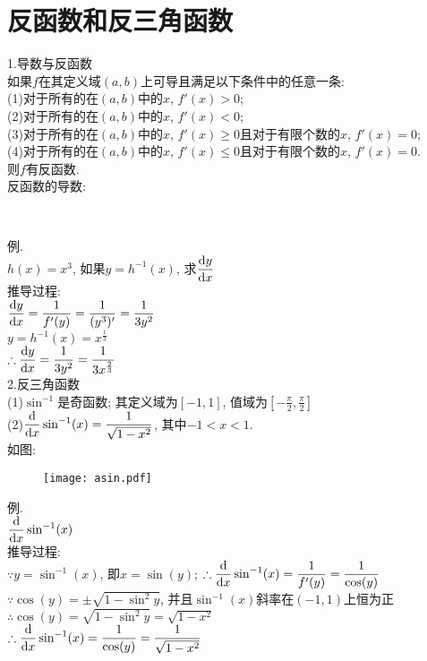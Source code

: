 \chapter{反函数和反三角函数}
1.导数与反函数\\
如果$f$在其定义域$(a,b)$上可导且满足以下条件中的任意一条:\\
(1)对于所有的在$(a,b)$中的$x$, $f'(x)>0$;\\
(2)对于所有的在$(a,b)$中的$x$, $f'(x)<0$;\\
(3)对于所有的在$(a,b)$中的$x$, $f'(x)\geqslant 0$且对于有限个数的$x$, $f'(x)=0$;\\
(4)对于所有的在$(a,b)$中的$x$, $f'(x)\leqslant 0$且对于有限个数的$x$, $f'(x)=0$.\\
则$f$有反函数.\\[2ex]

反函数的导数:
\begin{center}
\\[1ex]
\end{center}
例.\\
\phantom{例}$h(x)=x^3$, 如果$y=h^{-1}(x)$, 求$\displaystyle\frac{\mathop{}\!\mathrm{d} y}{\mathop{}\!\mathrm{d} x}$\\
推导过程:\\
$\displaystyle\frac{\mathop{}\!\mathrm{d} y}{\mathop{}\!\mathrm{d} x}=\frac{1}{f'(y)}=\frac{1}{(y^3)'}=\frac{1}{3y^2}$\\
$\displaystyle y=h^{-1}(x)=x^{\frac{1}{3}}$\\
$\displaystyle\therefore\frac{\mathop{}\!\mathrm{d} y}{\mathop{}\!\mathrm{d} x}=\frac{1}{3y^2}=\frac{1}{3x^{\frac{2}{3}}}$\\[2ex]

2.反三角函数\\
(1)$\sin^{-1}$是奇函数; 其定义域为$[-1,1]$, 值域为$\displaystyle[-\frac{\pi}{2},\frac{\pi}{2}]$\\[1ex]
(2)$\displaystyle\frac{\mathop{}\!\mathrm{d} }{\mathop{}\!\mathrm{d} x}\sin^{-1}(x)=\frac{1}{\sqrt{1-x^2}}$, 其中$-1<x<1$.\\[1ex]
如图:
\begin{figure}[H]
\centering
	\texttt{[image: asin.pdf]}
\end{figure}
例.\\
\phantom{例}$\displaystyle\frac{\mathop{}\!\mathrm{d}}{\mathop{}\!\mathrm{d} x}\sin^{-1}(x)$\\
推导过程:\\
$\displaystyle\because y=\sin^{-1}(x)$, 即$x=\sin(y)$;
$\displaystyle\therefore\frac{\mathop{}\!\mathrm{d}}{\mathop{}\!\mathrm{d} x}\sin^{-1}(x)=\frac{1}{f'(y)}=\frac{1}{\cos(y)}$\\
$\displaystyle\because\cos(y)=\pm\sqrt{1-\sin^2y}$, 并且$\sin^{-1}(x)$斜率在$(-1,1)$上恒为正\\
$\displaystyle\therefore\cos(y)=\sqrt{1-\sin^2y}=\sqrt{1-x^2}$\\
$\displaystyle\therefore\frac{\mathop{}\!\mathrm{d}}{\mathop{}\!\mathrm{d} x}\sin^{-1}(x)=\frac{1}{\cos(y)}=\frac{1}{\sqrt{1-x^2}}$\\[1ex]

